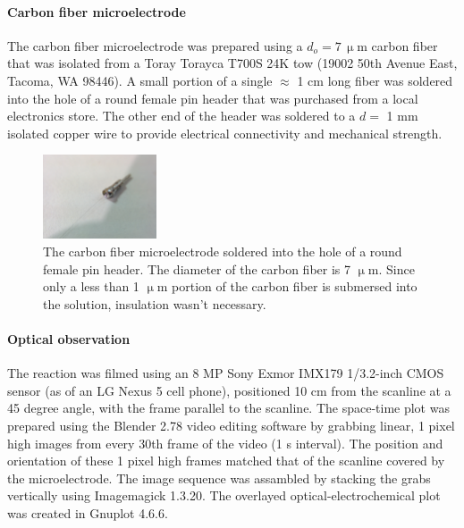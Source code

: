 \documentclass[3p, twocolumn]{elsarticle}
\begin{document}
\paragraph{Carbon fiber microelectrode} The carbon fiber microelectrode was prepared using a $d_o = 7\, \upmu$m carbon fiber that was isolated from a Toray Torayca T700S 24K tow (19002 50th Avenue East, Tacoma, WA 98446).
A small portion of a single $\approx$ 1 cm long fiber was soldered into the hole of a round female pin header that was purchased from a local electronics store. 
The other end of the header was soldered to a $d = $ 1 mm isolated copper wire to provide electrical connectivity and mechanical strength. 

\begin{figure}
\centering
\includegraphics[trim = 200mm 100mm 150mm 200mm, clip, width=0.3\textwidth]{microelectrode.jpg}
\caption{The carbon fiber microelectrode soldered into the hole of a round female pin header. The diameter of the carbon fiber is 7 $\upmu$m. Since only a less than 1 $\upmu$m portion of the carbon fiber is submersed into the solution, insulation wasn't necessary.}
\label{fig:microelectrode}
\end{figure}



\paragraph{Optical observation}
The reaction was filmed using an 8 MP Sony Exmor IMX179 1/3.2-inch CMOS sensor (as of an LG Nexus 5 cell phone), positioned 10 cm from the scanline at a 45 degree angle, with the frame parallel to the scanline.
The space-time plot was prepared using the Blender 2.78 video editing software by grabbing linear, 1 pixel high images from every 30th frame of the video (1 s interval).
The position and orientation of these 1 pixel high frames matched that of the scanline covered by the microelectrode.
The image sequence was assambled by stacking the grabs vertically using Imagemagick 1.3.20.
The overlayed optical-electrochemical plot was created in Gnuplot 4.6.6.

\end{document}
